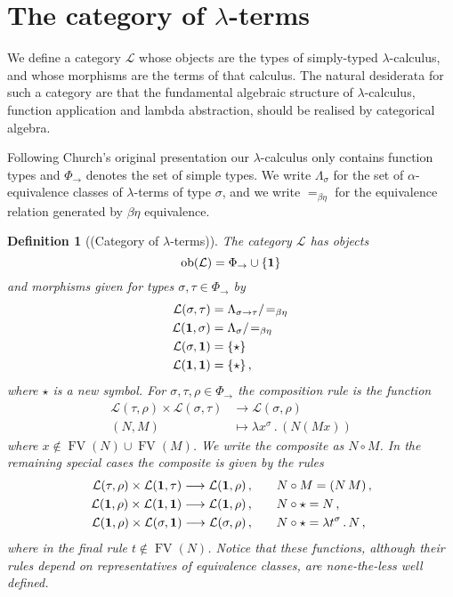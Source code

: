 \documentclass[english,letter paper,12pt,leqno]{article}
\newcommand{\call}[1]{\mathcal{#1}}
\def\ldot{\,.\,}
\def\FV{\operatorname{FV}}
\def\typearrow{\rightarrow}
\def\ldot{\,.\,}
\def\typearrow{\Rightarrow}
\def\FV{\operatorname{FV}}
\theoremstyle{example}
\newtheorem{definition}[theorem]{Definition}
\numberwithin{equation}{section}
\def\ldot{\,.\,}
\def\FV{\operatorname{FV}}
\def\typearrow{\rightarrow}
\begin{document}
\section{The category of $\lambda$-terms}
We define a category $\call{L}$ whose objects are the types of simply-typed $\lambda$-calculus, and whose morphisms are the terms of that calculus. The natural desiderata for such a category are that the fundamental algebraic structure of $\lambda$-calculus, function application and lambda abstraction, should be realised by categorical algebra.

Following Church's original presentation our $\lambda$-calculus only contains function types and $\Phi_{\typearrow}$ denotes the set of simple types. We write $\Lambda_\sigma$ for the set of $\alpha$-equivalence classes of $\lambda$-terms of type $\sigma$, and we write $=_{\beta\eta}$ for the equivalence relation generated by $\beta\eta$ equivalence.

\begin{definition}[(Category of $\lambda$-terms)]\label{definition:lambda_cat} The category $\call{L}$ has objects
	\[
	\operatorname{ob}(\call{L}) = \Phi_{\typearrow} \cup \{ \bold{1} \}
	\]
	and morphisms given for types $\sigma, \tau \in \Phi_{\typearrow}$ by
	\begin{align*}
		\call{L}(\sigma, \tau) &= \Lambda_{\sigma \typearrow \tau}/\!=_{\beta\eta}\,\\
		\call{L}(\bold{1}, \sigma) &= \Lambda_{\sigma}/\!=_{\beta\eta}\,\\
		\call{L}(\sigma, \bold{1}) &= \{ \star \}\,\\
		\call{L}(\bold{1},\bold{1}) &= \{ \star \}\,,
	\end{align*}
	where $\star$ is a new symbol. For $\sigma, \tau, \rho \in \Phi_{\typearrow}$ the composition rule is the function
	\begin{align}
		\label{eq:tttt}\call{L}(\tau, \rho) \times \call{L}(\sigma, \tau) &\longrightarrow \call{L}(\sigma, \rho)\\
		(N,M) &\longmapsto \lambda x^\sigma \ldot (N (M x))
	\end{align}
	where $x \not\in \FV(N) \cup \FV(M)$. We write the composite as $N \circ M$. In the remaining special cases the composite is given by the rules
	\begin{align}
		\label{eq:ttct}\call{L}(\tau, \rho) \times \call{L}(\bold{1}, \tau) \longrightarrow \call{L}(\bold{1}, \rho)\,, \qquad & N \circ M = (N \, M)\,,\\
		\label{eq:ctcc}\call{L}(\bold{1}, \rho) \times \call{L}(\bold{1}, \bold{1}) \longrightarrow \call{L}(\bold{1}, \rho)\,, \qquad & N \circ \star = N\,,\\
		\label{eq:cttc}\call{L}(\bold{1}, \rho) \times \call{L}(\sigma, \bold{1}) \longrightarrow \call{L}(\sigma, \rho)\,, \qquad & N \circ \star = \lambda t^\sigma \ldot N\,,
	\end{align}
	where in the final rule $t \notin \FV(N)$. Notice that these functions, although their rules depend on representatives of equivalence classes, are none-the-less well defined.
\end{definition}
\end{document}
